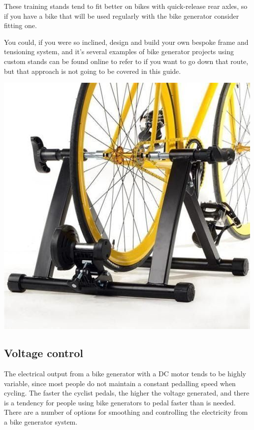 \documentclass{article}
\theoremstyle{definition}
\theoremstyle{definition}
\theoremstyle{remark}
\begin{document}
    These training stands tend to fit better on bikes with quick-release rear axles, so if you have a bike that will be used regularly with the bike generator consider fitting one. 

    You could, if you were so inclined, design and build your own bespoke frame and tensioning system, and it’s several examples of bike generator projects using custom stands can be found online to refer to if you want to go down that route, but that approach is not going to be covered in this guide.
  
    \begin{center}
      \includegraphics[width=0.25\paperwidth]{../Images/image_3_2_(training_stands).png}
    \end{center}
  

  \subsection{Voltage control} %
  \label{sub:voltage_control}

    The electrical output from a bike generator with a DC motor tends to be highly variable, since most people do not maintain a constant pedalling speed when cycling. The faster the cyclist pedals, the higher the voltage generated, and there is a tendency for people using bike generators to pedal faster than is needed. There are a number of options for smoothing and controlling the electricity from a bike generator system.
\end{document}
